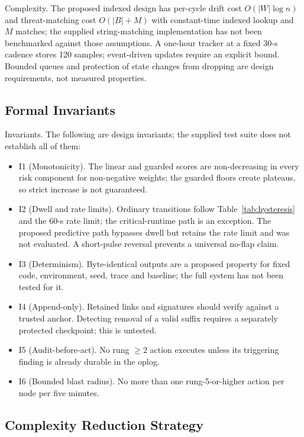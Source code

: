 \documentclass{ieeeaccess}
\renewcommand{\textbf}[1]{#1}
\begin{document}
\noindent\textbf{Complexity.} The proposed indexed design has per-cycle drift cost $O(|W|\log n)$ and threat-matching cost $O(|B|+M)$ with constant-time indexed lookup and $M$ matches; the supplied string-matching implementation has not been benchmarked against those assumptions. A one-hour tracker at a fixed 30-s cadence stores 120 samples; event-driven updates require an explicit bound. Bounded queues and protection of state changes from dropping are design requirements, not measured properties.

\subsection{Formal Invariants}
\label{subsec:invariants}

\noindent\textbf{Invariants.} The following are design invariants; the supplied test suite does not establish all of them:
\begin{itemize}
\item \textbf{I1 (Monotonicity).} The linear and guarded scores are non-decreasing in every risk component for non-negative weights; the guarded floors create plateaus, so strict increase is not guaranteed.
\item \textbf{I2 (Dwell and rate limits).} Ordinary transitions follow Table~\ref{tab:hysteresis} and the 60-s rate limit; the critical-runtime path is an exception. The proposed predictive path bypasses dwell but retains the rate limit and was not evaluated. A short-pulse reversal prevents a universal no-flap claim.
\item \textbf{I3 (Determinism).} Byte-identical outputs are a proposed property for fixed code, environment, seed, trace and baseline; the full system has not been tested for it.
\item \textbf{I4 (Append-only).} Retained links and signatures should verify against a trusted anchor. Detecting removal of a valid suffix requires a separately protected checkpoint; this is untested.
\item \textbf{I5 (Audit-before-act).} No rung $\geq 2$ action executes unless its triggering finding is already durable in the oplog.
\item \textbf{I6 (Bounded blast radius).} No more than one rung-5-or-higher action per node per five minutes.
\end{itemize}

\subsection{Complexity Reduction Strategy}
\label{subsec:complexity}
\end{document}
